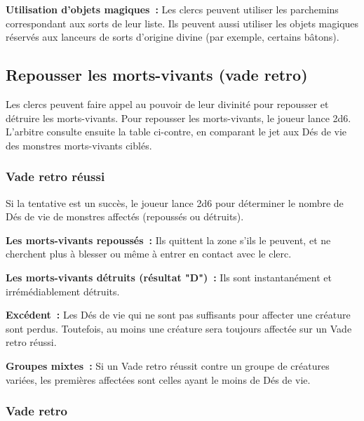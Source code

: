 \textbf{Utilisation d'objets magiques~:} Les clercs peuvent utiliser les
parchemins correspondant aux sorts de leur liste. Ils peuvent aussi
utiliser les objets magiques réservés aux lanceurs de sorts d'origine
divine (par exemple, certains bâtons).

\subsection{Repousser les morts-vivants (vade  retro)}\label{repousser-les-morts-vivants-vade-retro}

Les clercs peuvent faire appel au pouvoir de leur divinité pour
repousser et détruire les morts-vivants. Pour repousser les
morts-vivants, le joueur lance 2d6. L'arbitre consulte ensuite la table
ci-contre, en comparant le jet aux Dés de vie des monstres morts-vivants
ciblés.

\subsubsection{Vade retro réussi}\label{vade-retro-ruxe9ussi}

Si la tentative est un succès, le joueur lance 2d6 pour déterminer le
nombre de Dés de vie de monstres affectés (repoussés ou détruits).

\textbf{Les morts-vivants repoussés~:} Ils quittent la zone s'ils le
peuvent, et ne cherchent plus à blesser ou même à entrer en contact avec
le clerc.

\textbf{Les morts-vivants détruits (résultat "D")~:} Ils sont
instantanément et irrémédiablement détruits.

\textbf{Excédent~:} Les Dés de vie qui ne sont pas suffisants pour
affecter une créature sont perdus. Toutefois, au moins une créature sera
toujours affectée sur un Vade retro réussi.

\textbf{Groupes mixtes~:} Si un Vade retro réussit contre un groupe de
créatures variées, les premières affectées sont celles ayant le moins de
Dés de vie.

\subsubsection{Vade retro}\label{vade-retro}

